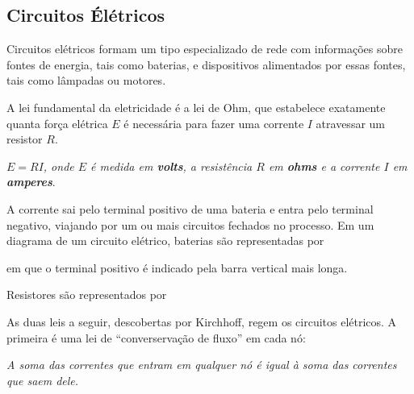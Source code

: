 \subsection{Circuitos Élétricos}

Circuitos elétricos formam um tipo especializado de rede com informações sobre fontes de energia, tais como baterias, e dispositivos alimentados por essas fontes, tais como lâmpadas ou motores.

A lei fundamental da eletricidade é a \textrm{lei de Ohm}, que estabelece exatamente quanta força elétrica $E$ é necessária para fazer uma corrente $I$ atravessar um resistor $R$.

\begin{tcolorbox}[colback=green!30, colframe=green!80!blue, title=Lei de Ohm]
    \textit{$E = RI$, onde $E$ é medida em \textbf{volts}, a resistência $R$ em \textbf{ohms} e a corrente $I$ em \textbf{amperes}}.
\end{tcolorbox}

A corrente sai pelo terminal positivo de uma bateria e entra pelo terminal negativo, viajando por um ou mais circuitos fechados no processo. Em um diagrama de um circuito elétrico, baterias são representadas por
\begin{center}
\end{center}
em que o terminal positivo é indicado pela barra vertical mais longa.

Resistores são representados por
\begin{center}
\end{center}

As duas leis a seguir, descobertas por Kirchhoff, regem os circuitos elétricos. A primeira é uma lei de ``converservação de fluxo'' em cada nó:

\begin{tcolorbox}[colback=green!30, colframe=green!80!blue, title=Lei da Corrente (nós)]
    \textit{A soma das correntes que entram em qualquer nó é igual à soma das correntes que saem dele.}
\end{tcolorbox}

